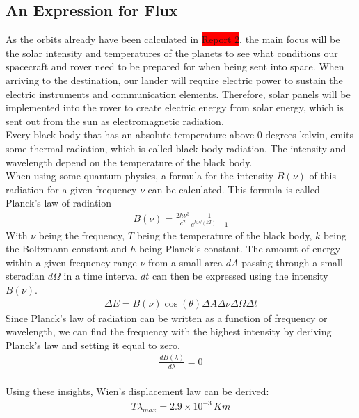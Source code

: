 \documentclass[reprint,english,notitlepage]{revtex4-2}
\begin{document}
\subsection{An Expression for Flux}\label{subsec:an-expression-for-flux}
As the orbits already have been calculated in \colorbox{red}{Report 2}, the main focus will be the solar intensity and temperatures of the planets to see what conditions our spacecraft and rover need to be prepared for when being sent into space.
When arriving to the destination, our lander will require electric power to sustain the electric instruments and communication elements.
Therefore, solar panels will be implemented into the rover to create electric energy from solar energy, which is sent out from the sun as electromagnetic radiation.\\
Every black body that has an absolute temperature above 0 degrees kelvin, emits some thermal radiation, which is called black body radiation.
The intensity and wavelength depend on the temperature of the black body.\\
When using some quantum physics, a formula for the intensity $B(\nu)$ of this radiation for a given frequency $\nu$ can be calculated.
This formula is called Planck's law of radiation
\begin{align*}
    B(\nu) = \frac{2h\nu^3}{c^2}\frac{1}{e^{h\nu/(kT)}-1}
\end{align*}
With $\nu$ being the frequency, $T$ being the temperature of the black body, $k$ being the Boltzmann constant and $h$ being Planck's constant.
The amount of energy within a given frequency range $\nu$ from a small area $dA$ passing through a small steradian $d\Omega$ in a time interval $dt$ can then be expressed using the intensity $B(\nu)$.
\begin{align*}
    \Delta E = B(\nu) \cos\left(\theta\right) \Delta A \Delta\nu \Delta\Omega \Delta t
\end{align*}
Since Planck's law of radiation can be written as a function of frequency or wavelength, we can find the frequency with the highest intensity by deriving Planck's law and setting it equal to zero.
\begin{align*}
	\frac{dB(\lambda)}{d\lambda} = 0
\end{align*}\\
Using these insights, Wien's displacement law can be derived:
\begin{align*}
    T\lambda_{max} = 2.9 \times 10^{-3} \, Km
\end{align*}\\
\end{document}
